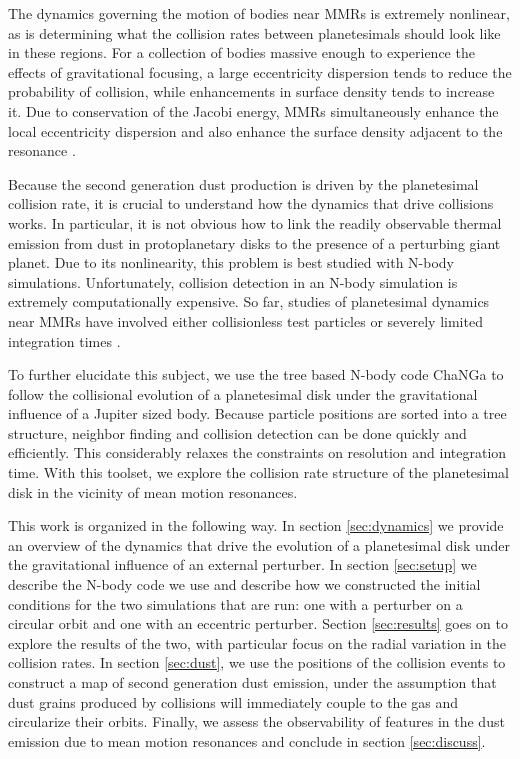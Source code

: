 \documentclass[twocolumn]{aastex62}
\begin{document}
The dynamics governing the motion of bodies near MMRs is extremely nonlinear, as is determining what the collision rates between planetesimals should look like in these regions. For a collection of bodies massive enough to experience the effects of gravitational focusing, a large eccentricity dispersion tends to reduce the probability of collision, while enhancements in surface density tends to increase it. Due to conservation of the Jacobi energy, MMRs simultaneously enhance the local eccentricity dispersion and also enhance the surface density adjacent to the resonance \citep{2000Icar..143...45R, 2017ApJ...850..103B}.

Because the second generation dust production is driven by the planetesimal collision rate, it is crucial to understand how the dynamics that drive collisions works. In particular, it is not obvious how to link the readily observable thermal emission from dust in protoplanetary disks to the presence of a perturbing giant planet. Due to its nonlinearity, this problem is best studied with N-body simulations. Unfortunately, collision detection in an N-body simulation is extremely computationally expensive. So far, studies of planetesimal dynamics near MMRs have involved either collisionless test particles \citep{2017ApJ...850..103B, 2016ApJ...818..159T, 2018ApJ...857....3T} or severely limited integration times \citep{2000Icar..143...45R}.

To further elucidate this subject, we use the tree based N-body code {\sc ChaNGa} \citep{2008IEEEpds...ChaNGa, 2015AphCom..2..1} to follow the collisional evolution of a planetesimal disk under the gravitational influence of a Jupiter sized body. Because particle positions are sorted into a tree structure, neighbor finding and collision detection can be done quickly and efficiently. This considerably relaxes the constraints on resolution and integration time. With this toolset, we explore the collision rate structure of the planetesimal disk in the vicinity of mean motion resonances.

This work is organized in the following way. In section \ref{sec:dynamics} we provide an overview of the dynamics that drive the evolution of a planetesimal disk under the gravitational influence of an external perturber. In section \ref{sec:setup} we describe the N-body code we use and describe how we constructed the initial conditions for the two simulations that are run: one with a perturber on a circular orbit and one with an eccentric perturber. Section \ref{sec:results} goes on to explore the results of the two, with particular focus on the radial variation in the collision rates. In section \ref{sec:dust}, we use the positions of the collision events to construct a map of second generation dust emission, under the assumption that dust grains produced by collisions will immediately couple to the gas and circularize their orbits. Finally, we assess the observability of features in the dust emission due to mean motion resonances and conclude in section \ref{sec:discuss}.
\end{document}
